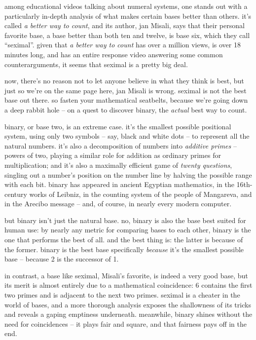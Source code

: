 \documentclass[../best.tex]{subfiles}
\begin{document}
among educational videos talking about numeral systems, one stands out with a particularly in-depth analysis of what makes certain bases better than others. it's called {\it a better way to count}, and its author, jan Misali, says that their personal favorite base, a base better than both ten and twelve, is base six, which they call ``seximal''. given that {\it a better way to count} has over a million views, is over 18 minutes long, and has an entire response video answering some common counterarguments, it seems that seximal is a pretty big deal.

\newpage

now, there's no reason not to let anyone believe in what they think is best, but just so we're on the same page here, jan Misali is wrong. seximal is not the best base out there. so fasten your mathematical seatbelts, because we're going down a deep rabbit hole -- on a quest to discover binary, the \emph{actual} best way to count.

\sectionbreak

binary, or base two, is an extreme case. it's the smallest possible positional system, using only two symbols -- say, black and white dots -- to represent all the natural numbers. it's also a decomposition of numbers into {\it additive primes} -- powers of two, playing a similar role for addition as ordinary primes for multiplication; and it's also a maximally efficient game of {\it twenty questions}, singling out a number's position on the number line by halving the possible range with each bit. binary has appeared in ancient Egyptian mathematics,\myfootnote[i]{} in the 16th-century works of Leibniz,\myfootnote[i]{} in the counting system of the people of Mangareva,\myfootnote[i]{} and in the Arecibo message\myfootnote[i]{} -- and, of course, in nearly every modern computer.

but binary isn't just the natural base. no, binary is also the base best suited for human use: by nearly any metric for comparing bases to each other, binary is the one that performs the best of all. and the best thing is: the latter is because of the former. binary is the best base specifically \emph{because} it's the smallest possible base -- because 2 is the successor of 1.

in contrast, a base like seximal, Misali's favorite, is indeed a very good base, but its merit is almost entirely due to a mathematical coincidence: 6 contains the first two primes and is adjacent to the next two primes. seximal is a cheater in the world of bases, and a more thorough analysis exposes the shallowness of its tricks and reveals a gaping emptiness underneath. meanwhile, binary shines without the need for coincidences -- it plays fair and square, and that fairness pays off in the end.
\end{document}
